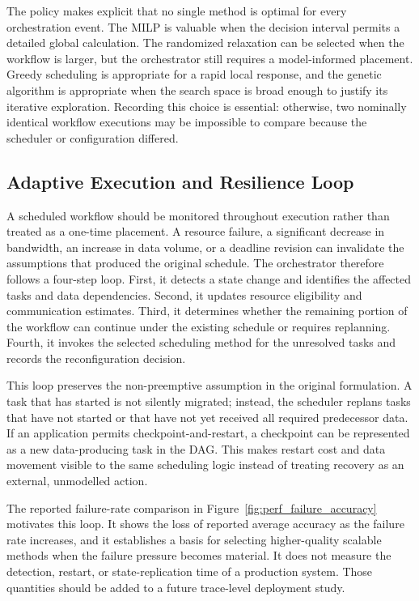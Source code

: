 The policy makes explicit that no single method is optimal for every orchestration event. The MILP is valuable when the decision interval permits a detailed global calculation. The randomized relaxation can be selected when the workflow is larger, but the orchestrator still requires a model-informed placement. Greedy scheduling is appropriate for a rapid local response, and the genetic algorithm is appropriate when the search space is broad enough to justify its iterative exploration. Recording this choice is essential: otherwise, two nominally identical workflow executions may be impossible to compare because the scheduler or configuration differed.

\subsection{Adaptive Execution and Resilience Loop}

A scheduled workflow should be monitored throughout execution rather than treated as a one-time placement. A resource failure, a significant decrease in bandwidth, an increase in data volume, or a deadline revision can invalidate the assumptions that produced the original schedule. The orchestrator therefore follows a four-step loop. First, it detects a state change and identifies the affected tasks and data dependencies. Second, it updates resource eligibility and communication estimates. Third, it determines whether the remaining portion of the workflow can continue under the existing schedule or requires replanning. Fourth, it invokes the selected scheduling method for the unresolved tasks and records the reconfiguration decision.

This loop preserves the non-preemptive assumption in the original formulation. A task that has started is not silently migrated; instead, the scheduler replans tasks that have not started or that have not yet received all required predecessor data. If an application permits checkpoint-and-restart, a checkpoint can be represented as a new data-producing task in the DAG. This makes restart cost and data movement visible to the same scheduling logic instead of treating recovery as an external, unmodelled action.

The reported failure-rate comparison in Figure~\ref{fig:perf_failure_accuracy} motivates this loop. It shows the loss of reported average accuracy as the failure rate increases, and it establishes a basis for selecting higher-quality scalable methods when the failure pressure becomes material. It does not measure the detection, restart, or state-replication time of a production system. Those quantities should be added to a future trace-level deployment study.

